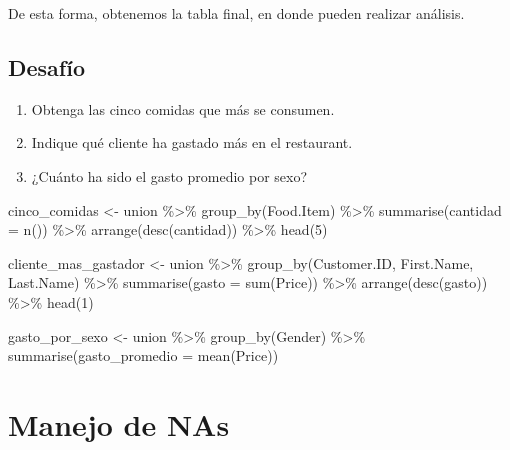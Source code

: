 \documentclass[
  letterpaper,
  DIV=11,
  numbers=noendperiod]{scrreprt}
\newenvironment{Shaded}{\begin{snugshade}}{\end{snugshade}}
\newcommand{\AttributeTok}[1]{\textcolor[rgb]{0.40,0.45,0.13}{#1}}
\newcommand{\DecValTok}[1]{\textcolor[rgb]{0.68,0.00,0.00}{#1}}
\newcommand{\FunctionTok}[1]{\textcolor[rgb]{0.28,0.35,0.67}{#1}}
\newcommand{\NormalTok}[1]{\textcolor[rgb]{0.00,0.23,0.31}{#1}}
\newcommand{\OtherTok}[1]{\textcolor[rgb]{0.00,0.23,0.31}{#1}}
\newcommand{\SpecialCharTok}[1]{\textcolor[rgb]{0.37,0.37,0.37}{#1}}
\begin{document}
De esta forma, obtenemos la tabla final, en donde pueden realizar
análisis.

\hypertarget{desafuxedo-1}{%
\subsection{Desafío}\label{desafuxedo-1}}

\begin{enumerate}
\def\labelenumi{\arabic{enumi}.}
\item
  Obtenga las cinco comidas que más se consumen.
\item
  Indique qué cliente ha gastado más en el restaurant.
\item
  ¿Cuánto ha sido el gasto promedio por sexo?
\end{enumerate}

\begin{Shaded}
\begin{Highlighting}[]
\NormalTok{cinco\_comidas }\OtherTok{\textless{}{-}}\NormalTok{ union }\SpecialCharTok{\%\textgreater{}\%} 
  \FunctionTok{group\_by}\NormalTok{(Food.Item) }\SpecialCharTok{\%\textgreater{}\%} 
  \FunctionTok{summarise}\NormalTok{(}\AttributeTok{cantidad =} \FunctionTok{n}\NormalTok{()) }\SpecialCharTok{\%\textgreater{}\%} 
  \FunctionTok{arrange}\NormalTok{(}\FunctionTok{desc}\NormalTok{(cantidad)) }\SpecialCharTok{\%\textgreater{}\%} 
  \FunctionTok{head}\NormalTok{(}\DecValTok{5}\NormalTok{)}

\NormalTok{cliente\_mas\_gastador }\OtherTok{\textless{}{-}}\NormalTok{ union }\SpecialCharTok{\%\textgreater{}\%} 
  \FunctionTok{group\_by}\NormalTok{(Customer.ID, First.Name, Last.Name) }\SpecialCharTok{\%\textgreater{}\%} 
  \FunctionTok{summarise}\NormalTok{(}\AttributeTok{gasto =} \FunctionTok{sum}\NormalTok{(Price)) }\SpecialCharTok{\%\textgreater{}\%} 
  \FunctionTok{arrange}\NormalTok{(}\FunctionTok{desc}\NormalTok{(gasto)) }\SpecialCharTok{\%\textgreater{}\%} 
  \FunctionTok{head}\NormalTok{(}\DecValTok{1}\NormalTok{)}

\NormalTok{gasto\_por\_sexo }\OtherTok{\textless{}{-}}\NormalTok{ union }\SpecialCharTok{\%\textgreater{}\%} 
  \FunctionTok{group\_by}\NormalTok{(Gender) }\SpecialCharTok{\%\textgreater{}\%} 
  \FunctionTok{summarise}\NormalTok{(}\AttributeTok{gasto\_promedio =} \FunctionTok{mean}\NormalTok{(Price))}
\end{Highlighting}
\end{Shaded}

\hypertarget{manejo-de-nas}{%
\section{Manejo de NAs}\label{manejo-de-nas}}
\end{document}
